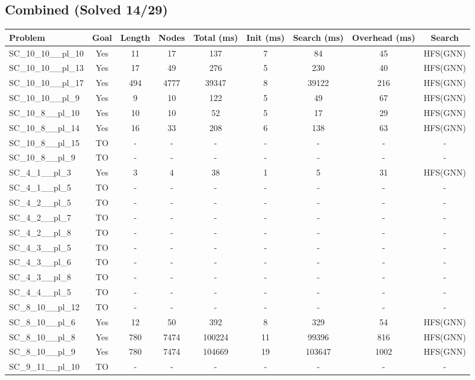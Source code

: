 \documentclass{article}
\begin{document}
\subsection*{Combined (Solved 14/29)}
\begin{tabular}{lcccccccc}
\toprule
Problem & Goal & Length & Nodes & Total (ms) & Init (ms) & Search (ms) & Overhead (ms) & Search \\
\midrule
SC\_10\_10\_\_pl\_10 & Yes & 11 & 17 & 137 & 7 & 84 & 45 & HFS(GNN) \\
SC\_10\_10\_\_pl\_13 & Yes & 17 & 49 & 276 & 5 & 230 & 40 & HFS(GNN) \\
SC\_10\_10\_\_pl\_17 & Yes & 494 & 4777 & 39347 & 8 & 39122 & 216 & HFS(GNN) \\
SC\_10\_10\_\_pl\_9 & Yes & 9 & 10 & 122 & 5 & 49 & 67 & HFS(GNN) \\
SC\_10\_8\_\_pl\_10 & Yes & 10 & 10 & 52 & 5 & 17 & 29 & HFS(GNN) \\
SC\_10\_8\_\_pl\_14 & Yes & 16 & 33 & 208 & 6 & 138 & 63 & HFS(GNN) \\
SC\_10\_8\_\_pl\_15 & TO & - & - & - & - & - & - & - \\
SC\_10\_8\_\_pl\_9 & TO & - & - & - & - & - & - & - \\
SC\_4\_1\_\_pl\_3 & Yes & 3 & 4 & 38 & 1 & 5 & 31 & HFS(GNN) \\
SC\_4\_1\_\_pl\_5 & TO & - & - & - & - & - & - & - \\
SC\_4\_2\_\_pl\_5 & TO & - & - & - & - & - & - & - \\
SC\_4\_2\_\_pl\_7 & TO & - & - & - & - & - & - & - \\
SC\_4\_2\_\_pl\_8 & TO & - & - & - & - & - & - & - \\
SC\_4\_3\_\_pl\_5 & TO & - & - & - & - & - & - & - \\
SC\_4\_3\_\_pl\_6 & TO & - & - & - & - & - & - & - \\
SC\_4\_3\_\_pl\_8 & TO & - & - & - & - & - & - & - \\
SC\_4\_4\_\_pl\_5 & TO & - & - & - & - & - & - & - \\
SC\_8\_10\_\_pl\_12 & TO & - & - & - & - & - & - & - \\
SC\_8\_10\_\_pl\_6 & Yes & 12 & 50 & 392 & 8 & 329 & 54 & HFS(GNN) \\
SC\_8\_10\_\_pl\_8 & Yes & 780 & 7474 & 100224 & 11 & 99396 & 816 & HFS(GNN) \\
SC\_8\_10\_\_pl\_9 & Yes & 780 & 7474 & 104669 & 19 & 103647 & 1002 & HFS(GNN) \\
SC\_9\_11\_\_pl\_10 & TO & - & - & - & - & - & - & - \\

\end{tabular}
\end{document}
